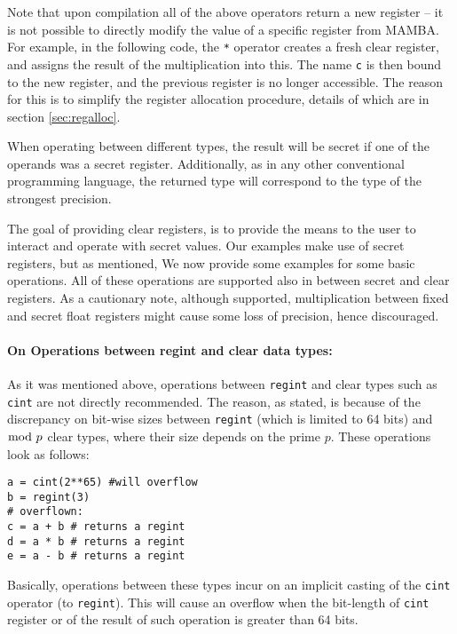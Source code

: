 Note that upon compilation all of the above operators return a
new register -- it is not possible to directly modify the value
of a specific register from MAMBA.
For example, in the following code, the \verb|*| operator creates a
fresh clear register, and assigns the result of the multiplication into this.
The name \verb|c| is then bound to the new register, and the previous
register is no longer accessible. The reason for this is to simplify the
register allocation procedure, details of which are in section
\ref{sec:regalloc}.

When operating between different types, the result will be
secret if one of the operands was a secret register.
Additionally, as in any other conventional programming language,
the returned type will correspond to the type of the strongest precision.

The goal of providing clear registers, is to provide the means
to the user to interact and operate with secret values.
Our examples make use of secret registers, but as mentioned,
We now provide some examples for some basic operations.
All of these operations are supported also in between secret and clear registers.
As a cautionary note, although supported,
multiplication between fixed and secret float registers
might cause some loss of precision, hence discouraged.

\paragraph{On Operations between regint and clear data types:} As it was mentioned above, operations between \verb|regint| and clear types such as \verb|cint| are not directly recommended. The reason, as stated, is because of the discrepancy on bit-wise sizes between \verb|regint| (which is limited to 64 bits) and $\bmod \; p$ clear types, where their size depends on the prime $p$. These operations look as follows:
\begin{lstlisting}
a = cint(2**65) #will overflow
b = regint(3)
# overflown:
c = a + b # returns a regint
d = a * b # returns a regint
e = a - b # returns a regint
\end{lstlisting}
Basically, operations between these types incur on an implicit casting of the \verb|cint| operator (to \verb|regint|). This will cause an overflow when the bit-length of \verb|cint| register or of the result of such operation is greater than 64 bits.


